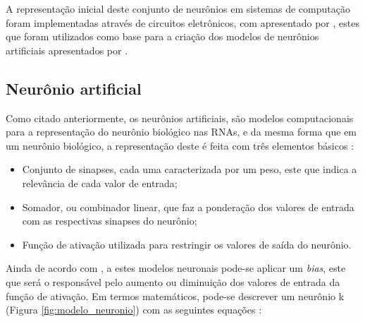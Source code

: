 


\par A representação inicial deste conjunto de neurônios em sistemas de computação foram implementadas através de circuitos eletrônicos, com apresentado por , estes que foram utilizados como base para a criação dos modelos de neurônios artificiais apresentados por .

\subsection{Neurônio artificial}

\par Como citado anteriormente, os neurônios artificiais, são modelos computacionais para a representação do neurônio biológico nas RNAs, e da mesma forma que em um neurônio biológico, a representação deste é feita com três elementos básicos \cite{Haykin2001}:  

\begin{itemize}
	\item Conjunto de sinapses, cada uma caracterizada por um peso, este que indica a relevância de cada valor de entrada;
	\item Somador, ou combinador linear, que faz a ponderação dos valores de entrada com as respectivas sinapses do neurônio;
	\item Função de ativação utilizada para restringir os valores de saída do neurônio.
\end{itemize}

\par Ainda de acordo com , a estes modelos neuronais pode-se aplicar um \textit{bias}, este que será o responsável pelo aumento ou diminuição dos valores de entrada da função de ativação. Em termos matemáticos, pode-se descrever um neurônio k (Figura \ref{fig:modelo_neuronio}) com as seguintes equações \cite{Haykin2001}:

